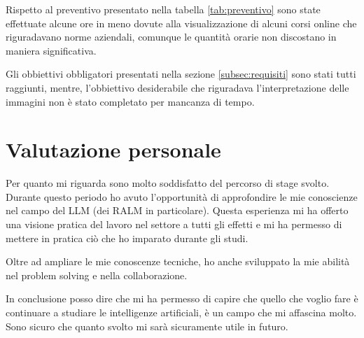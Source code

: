 Rispetto al preventivo presentato nella tabella \ref{tab:preventivo} sono state effettuate alcune ore in meno dovute alla visualizzazione di alcuni corsi online che riguradavano norme aziendali, comunque le quantità orarie non discostano in maniera significativa. 

Gli obbiettivi obbligatori presentati nella sezione \ref{subsec:requisiti} sono stati tutti raggiunti, mentre, l'obbiettivo desiderabile che riguradava l'interpretazione delle immagini non è stato completato per mancanza di tempo.

\section{Valutazione personale}
Per quanto mi riguarda sono molto soddisfatto del percorso di stage svolto.
Durante questo periodo ho avuto l'opportunità di approfondire le mie conoscienze nel campo del LLM (dei RALM in particolare).
Questa esperienza mi ha offerto una visione pratica del lavoro nel settore a tutti gli effetti e mi ha permesso di mettere in pratica ciò che ho imparato durante gli studi.


Oltre ad ampliare le mie conoscenze tecniche, ho anche sviluppato la mie abilità nel problem solving e nella collaborazione.

In conclusione posso dire che mi ha permesso di capire che quello che voglio fare è continuare a studiare le intelligenze artificiali, è un campo che mi affascina molto.
Sono sicuro che quanto svolto mi sarà sicuramente utile in futuro.
